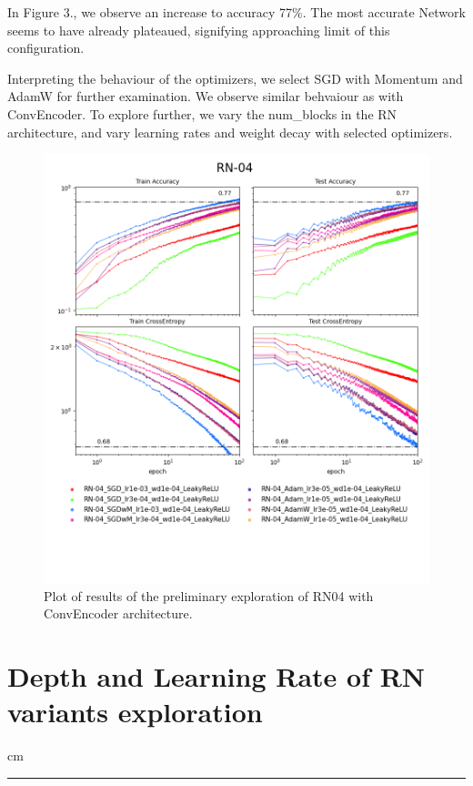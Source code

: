 \documentclass[12pt,a4paper]{article}
\newcommand {\sectionrule}{\vskip -0.9 cm
\color {mygray} \rule [0 cm] {17 cm}{0.1 mm} \color {black}}
\begin{document}
In Figure 3., we observe an increase to accuracy 77\%. The most accurate
Network seems to have already plateaued, signifying approaching limit
of this configuration.

Interpreting the behaviour of the optimizers, we select SGD with Momentum
and AdamW for further examination. We observe similar behvaiour as with
ConvEncoder. To explore further, we vary the num\_blocks in the RN
architecture, and vary learning rates and weight decay with selected
optimizers.

\begin{figure}[H]
  \includegraphics[width=\textwidth, trim={0, 3.5cm, 0, 0}, clip]{../logsRN-04.png}
  \caption{Plot of results of the preliminary exploration of RN04 with ConvEncoder
  architecture.}
\end{figure}

\section{Depth and Learning Rate of RN variants exploration}
\sectionrule
\end{document}

